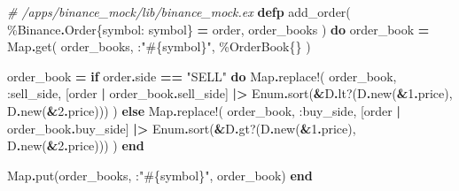 \documentclass[
]{book}
\newenvironment{Shaded}{\begin{snugshade}}{\end{snugshade}}
\newcommand{\CommentTok}[1]{\textcolor[rgb]{0.56,0.35,0.01}{\textit{#1}}}
\newcommand{\ConstantTok}[1]{\textcolor[rgb]{0.00,0.00,0.00}{#1}}
\newcommand{\ControlFlowTok}[1]{\textcolor[rgb]{0.13,0.29,0.53}{\textbf{#1}}}
\newcommand{\DecValTok}[1]{\textcolor[rgb]{0.00,0.00,0.81}{#1}}
\newcommand{\KeywordTok}[1]{\textcolor[rgb]{0.13,0.29,0.53}{\textbf{#1}}}
\newcommand{\NormalTok}[1]{#1}
\newcommand{\OperatorTok}[1]{\textcolor[rgb]{0.81,0.36,0.00}{\textbf{#1}}}
\newcommand{\OtherTok}[1]{\textcolor[rgb]{0.56,0.35,0.01}{#1}}
\newcommand{\StringTok}[1]{\textcolor[rgb]{0.31,0.60,0.02}{#1}}
\newcommand{\VariableTok}[1]{\textcolor[rgb]{0.00,0.00,0.00}{#1}}
\begin{document}
\begin{Shaded}
\begin{Highlighting}[]
\CommentTok{\# /apps/binance\_mock/lib/binance\_mock.ex}
  \KeywordTok{defp}\NormalTok{ add\_order(}
\NormalTok{         \%}\ConstantTok{Binance}\OperatorTok{.}\ConstantTok{Order}\NormalTok{\{}\VariableTok{symbol:}\NormalTok{ symbol\} }\OperatorTok{=}\NormalTok{ order,}
\NormalTok{         order\_books}
\NormalTok{       ) }\KeywordTok{do}
\NormalTok{    order\_book }\OperatorTok{=}
      \ConstantTok{Map}\OperatorTok{.}\NormalTok{get(}
\NormalTok{        order\_books,}
\NormalTok{        :}\StringTok{"}\OtherTok{\#\{}\NormalTok{symbol}\OtherTok{\}}\StringTok{"}\NormalTok{,}
\NormalTok{        \%}\ConstantTok{OrderBook}\NormalTok{\{\}}
\NormalTok{      )}

\NormalTok{    order\_book }\OperatorTok{=}
      \ControlFlowTok{if}\NormalTok{ order}\OperatorTok{.}\NormalTok{side }\OperatorTok{==} \StringTok{"SELL"} \KeywordTok{do}
        \ConstantTok{Map}\OperatorTok{.}\NormalTok{replace!(}
\NormalTok{          order\_book,}
          \VariableTok{:sell\_side}\NormalTok{,}
\NormalTok{          [order }\OperatorTok{|}\NormalTok{ order\_book}\OperatorTok{.}\NormalTok{sell\_side]}
          \OperatorTok{|\textgreater{}} \ConstantTok{Enum}\OperatorTok{.}\NormalTok{sort(}\OperatorTok{\&}\NormalTok{D}\OperatorTok{.}\NormalTok{lt?(D}\OperatorTok{.}\NormalTok{new(}\OperatorTok{\&}\DecValTok{1}\OperatorTok{.}\NormalTok{price), D}\OperatorTok{.}\NormalTok{new(}\OperatorTok{\&}\DecValTok{2}\OperatorTok{.}\NormalTok{price)))}
\NormalTok{        )}
      \ControlFlowTok{else}
        \ConstantTok{Map}\OperatorTok{.}\NormalTok{replace!(}
\NormalTok{          order\_book,}
          \VariableTok{:buy\_side}\NormalTok{,}
\NormalTok{          [order }\OperatorTok{|}\NormalTok{ order\_book}\OperatorTok{.}\NormalTok{buy\_side]}
          \OperatorTok{|\textgreater{}} \ConstantTok{Enum}\OperatorTok{.}\NormalTok{sort(}\OperatorTok{\&}\NormalTok{D}\OperatorTok{.}\NormalTok{gt?(D}\OperatorTok{.}\NormalTok{new(}\OperatorTok{\&}\DecValTok{1}\OperatorTok{.}\NormalTok{price), D}\OperatorTok{.}\NormalTok{new(}\OperatorTok{\&}\DecValTok{2}\OperatorTok{.}\NormalTok{price)))}
\NormalTok{        )}
      \KeywordTok{end}

    \ConstantTok{Map}\OperatorTok{.}\NormalTok{put(order\_books, :}\StringTok{"}\OtherTok{\#\{}\NormalTok{symbol}\OtherTok{\}}\StringTok{"}\NormalTok{, order\_book)}
  \KeywordTok{end}
\end{Highlighting}
\end{Shaded}
\end{document}
